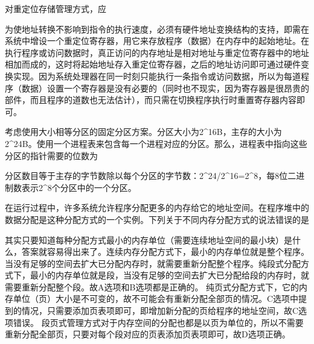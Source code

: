 \question 对重定位存储管理方式，应
\par{}
\begin{solution}为使地址转换不影响到指令的执行速度，必须有硬件地址变换结构的支持，即需在系统中增设一个重定位寄存器，用它来存放程序（数据）在内存中的起始地址。在执行程序或访问数据时，真正访问的内存地址是相对地址与重定位寄存器中的地址相加而成的，这时将起始地址存入重定位寄存器，之后的地址访问即可通过硬件变换实现。因为系统处理器在同一时刻只能执行一条指令或访问数据，所以为每道程序（数据）设置一个寄存器是没有必要的（同时也不现实，因为寄存器是很昂贵的部件，而且程序的道数也无法估计），而只需在切换程序执行时重置寄存器内容即可。
\end{solution}
\question 考虑使用大小相等分区的固定分区方案。分区大小为2\^{}16B，主存的大小为2\^{}24B。使用一个进程表来包含每一个进程对应的分区。那么，进程表中指向这些分区的指针需要的位数为
\par{}
\begin{solution}分区数目等于主存的字节数除以每个分区的字节数：2\^{}24/2\^{}16=2\^{}8，每8位二进制数表示2\^{}8个分区中的一个分区。
\end{solution}
\question 在运行过程中，许多系统允许程序分配更多的内存给它的地址空间。在程序堆中的数据分配是这种分配方式的一个实例。下列关于不同内存分配方式的说法错误的是
\par{}
\begin{solution}其实只要知道每种分配方式最小的内存单位（需要连续地址空间的最小块）是什么，答案就容易得出来了。连续内存分配方式下，最小的内存单位就是整个程序。当没有足够的空间去扩大已分配内存时，就需要重新分配整个程序。纯段式分配方式下，最小的内存单位就是段，当没有足够的空间去扩大已分配给段的内存时，就需要重新分配整个段。故A选项和B选项都是正确的。
纯页式分配方式下，它的内存单位（页）大小是不可变的，故不可能会有重新分配全部页的情况。C选项中提到的情况，只需要添加页表项即可，即增加新分配的页给程序的地址空间，故C选项错误。
段页式管理方式对于内存空间的分配也都是以页为单位的，所以不需要重新分配全部页，只要对每个段对应的页表添加页表项即可，故D选项正确。
\end{solution}
